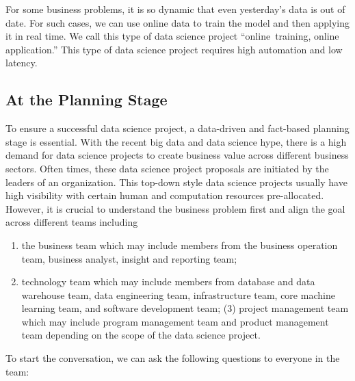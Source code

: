 \documentclass[12pt,]{krantz}
\theoremstyle{definition}
\theoremstyle{definition}
\theoremstyle{definition}
\theoremstyle{remark}
\begin{document}
For some business problems, it is so dynamic that even yesterday's data
is out of date. For such cases, we can use online data to train the
model and then applying it in real time. We call this type of data
science project ``online~training, online application.'' This type of
data science project requires high automation and low latency.

\subsection{At the Planning Stage}\label{at-the-planning-stage}

To ensure a successful data science project, a data-driven and
fact-based planning stage is essential. With the recent big data and
data science hype, there is a high demand for data science projects to
create business value across different business sectors. Often times,
these data science project proposals are initiated by the leaders of an
organization. This top-down style data science projects usually have
high visibility with certain human and computation resources
pre-allocated. However, it is crucial to understand the business problem
first and align the goal across different teams including

\begin{enumerate}
\def\labelenumi{(\arabic{enumi})}
\item
  the business team which may include members from the business
  operation team, business analyst, insight and reporting team;
\item
  technology team which may include members from database and data
  warehouse team, data engineering team, infrastructure team, core
  machine learning team, and software development team; (3) project
  management team which may include program management team and product
  management team depending on the scope of the data science project.
\end{enumerate}

To start the conversation, we can ask the following questions to
everyone in the team:
\end{document}
